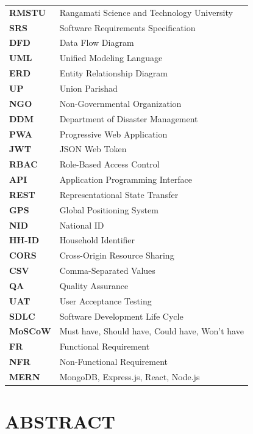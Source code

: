 \documentclass[11pt,a4paper]{report}
\begin{document}
\begin{tabularx}{\textwidth}{@{}lX@{}}
\textbf{RMSTU}    & Rangamati Science and Technology University \\
\textbf{SRS}      & Software Requirements Specification \\
\textbf{DFD}      & Data Flow Diagram \\
\textbf{UML}      & Unified Modeling Language \\
\textbf{ERD}      & Entity Relationship Diagram \\
\textbf{UP}       & Union Parishad \\
\textbf{NGO}      & Non-Governmental Organization \\
\textbf{DDM}      & Department of Disaster Management \\
\textbf{PWA}      & Progressive Web Application \\
\textbf{JWT}      & JSON Web Token \\
\textbf{RBAC}     & Role-Based Access Control \\
\textbf{API}      & Application Programming Interface \\
\textbf{REST}     & Representational State Transfer \\
\textbf{GPS}      & Global Positioning System \\
\textbf{NID}      & National ID \\
\textbf{HH-ID}    & Household Identifier \\
\textbf{CORS}     & Cross-Origin Resource Sharing \\
\textbf{CSV}      & Comma-Separated Values \\
\textbf{QA}       & Quality Assurance \\
\textbf{UAT}      & User Acceptance Testing \\
\textbf{SDLC}     & Software Development Life Cycle \\
\textbf{MoSCoW}   & Must have, Should have, Could have, Won't have \\
\textbf{FR}       & Functional Requirement \\
\textbf{NFR}      & Non-Functional Requirement \\
\textbf{MERN}     & MongoDB, Express.js, React, Node.js \\
\end{tabularx}

\clearpage

\chapter*{ABSTRACT}
\end{document}
